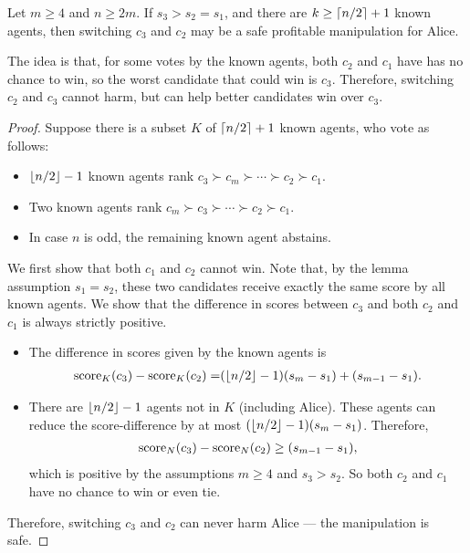 \iffalse
\begin{lemmarep}
Let $m\geq 4$ and $n\geq 2m$.
If $s_3 > s_2 = s_1$,
and there are $k\geq \left\lceil n/2 \right\rceil+1$ known agents,
then
switching $c_3$ and $c_2$ may be a safe profitable manipulation for Alice.
\end{lemmarep}
\begin{proofsketch}
The idea is that, for some votes by the known agents, both $c_2$ and $c_1$ have has no chance to win, 
so the worst candidate that could win is $c_3$.
Therefore, switching $c_2$ and $c_3$ cannot harm, but can help better candidates win over $c_3$.
\end{proofsketch}
\begin{proof}
Suppose there is a subset $K$ of $\left\lceil n/2 \right\rceil+1$ known agents, who vote as follows:
\begin{itemize}
\item $\left\lfloor n/2 \right\rfloor-1$ known agents rank $c_3 \succ c_m \succ \cdots \succ c_2 \succ c_1$.
\item Two known agents rank $c_m \succ c_3 \succ
\cdots \succ c_2 \succ c_1$. 
\item In case $n$ is odd, the remaining known agent abstains.
\end{itemize}
We first show that both $c_1$ and $c_2$ cannot win. 
Note that, by the lemma assumption $s_1=s_2$, these two candidates receive exactly the same score by all known agents. We show that the difference in scores between $c_3$ and both $c_2$ and $c_1$ is always strictly positive.
\begin{itemize}
\item The difference in scores given by the known agents is 
\begin{align*}
\operatorname{score}_K(c_3)-\operatorname{score}_K(c_2) =
&
(\left\lfloor n/2 \right\rfloor-1)(s_m-s_1) 
+ (s_{m-1}-s_1).
\\
\end{align*}
\item There are
$\left\lfloor n/2 \right\rfloor-1$ agents not in $K$ (including Alice).
These agents can reduce the score-difference by at most 
$(\left\lfloor n/2 \right\rfloor-1)(s_m-s_1)$.
Therefore, 
\begin{align*}
\operatorname{score}_N(c_3)-\operatorname{score}_N(c_2) \geq (s_{m-1}-s_1),
\end{align*}
which is positive 
by the assumptions $m\geq 4$ and $s_3>s_2$.
So both $c_2$ and $c_1$ have no chance to win or even tie.
\end{itemize}
Therefore, switching $c_3$ and $c_2$ can never harm Alice --- the manipulation is safe.


\end{proof}
